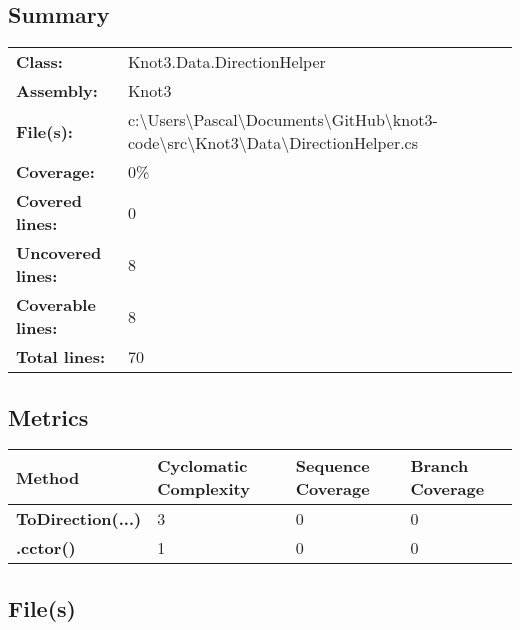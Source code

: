 \documentclass[a4paper,10pt]{article}
\begin{document}
\subsection{Summary}
\begin{longtable}[l]{ll}
\textbf{Class:} & Knot3.Data.DirectionHelper\\
\textbf{Assembly:} & Knot3\\
\textbf{File(s):} & \begin{minipage}[t]{12cm}{c:\textbackslash Users\textbackslash Pascal\textbackslash Documents\textbackslash GitHub\textbackslash knot3-code\textbackslash src\textbackslash Knot3\textbackslash Data\textbackslash DirectionHelper.cs}\end{minipage} \\
\textbf{Coverage:} & 0\%\\
\textbf{Covered lines:} & 0\\
\textbf{Uncovered lines:} & 8\\
\textbf{Coverable lines:} & 8\\
\textbf{Total lines:} & 70\\
\end{longtable}
\subsection{Metrics}
\begin{longtable}[l]{|l|l|l|l|}
\hline
\textbf{Method} & \textbf{Cyclomatic Complexity} & \textbf{Sequence Coverage} & \textbf{Branch Coverage}\\
\hline
\textbf{ToDirection(...)} & 3 & 0 & 0\\
\hline
\textbf{.cctor()} & 1 & 0 & 0\\
\hline
\end{longtable}
\subsection{File(s)}
\end{document}
